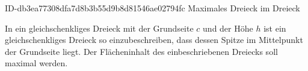 \begin{exercise}
      {ID-db3ea77308dfa7d8b3b55d9b8d81546ae02794fc}
      {Maximales Dreieck im Dreieck}
  \ifproblem\problem\par
    In ein gleichschenkliges Dreieck mit der Grundseite $c$ und der Höhe $h$
    ist ein gleichschenkliges Dreieck so einzubeschreiben, dass dessen Spitze
    im Mittelpunkt der Grundseite liegt. Der Flächeninhalt des einbeschriebenen
    Dreiecks soll maximal werden.
  \fi
\end{exercise}
